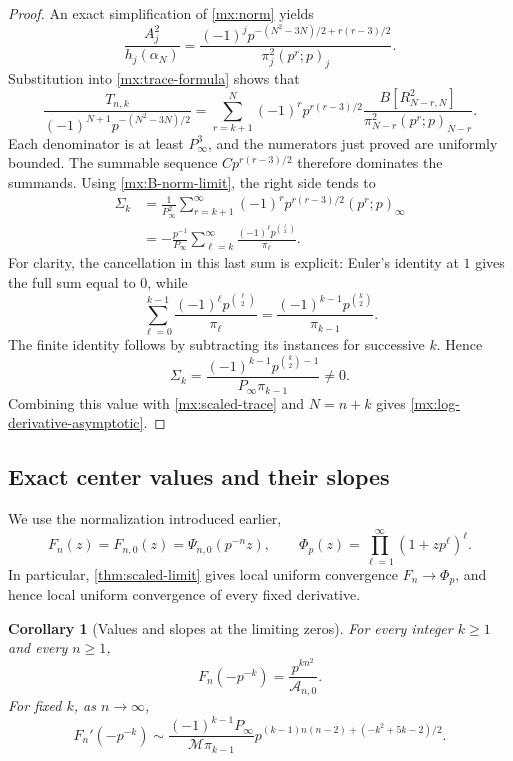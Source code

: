 \documentclass[11pt]{article}
\numberwithin{equation}{section}
\newtheorem{corollary}[corollary]{Corollary}
\theoremstyle{definition}
\theoremstyle{remark}
\begin{document}
\begin{proof}
An exact simplification of \eqref{mx:norm} yields
\begin{equation}\label{mx:norm-ratio}
 \frac{A_j^2}{h_j(\alpha_N)}
 =\frac{(-1)^j
 p^{-(N^2-3N)/2+r(r-3)/2}}
 {\pi_j^2(p^r;p)_j}.
\end{equation}
Substitution into \eqref{mx:trace-formula} shows that
\begin{equation}\label{mx:scaled-trace}
 \frac{T_{n,k}}{(-1)^{N+1}p^{-(N^2-3N)/2}}
 =\sum_{r=k+1}^{N}
 (-1)^rp^{r(r-3)/2}
 \frac{B[R_{N-r,N}^2]}
 {\pi_{N-r}^2(p^r;p)_{N-r}}.
\end{equation}
Each denominator is at least $P_\infty^3$, and the numerators just
proved are uniformly bounded.  The summable sequence
$C p^{r(r-3)/2}$ therefore dominates the summands.
Using \eqref{mx:B-norm-limit}, the right side tends to
\begin{align}
 \Sigma_k
 &=\frac1{P_\infty^2}
 \sum_{r=k+1}^{\infty}
 (-1)^rp^{r(r-3)/2}(p^r;p)_\infty\label{mx:Euler-tail}\\
 &=-\frac{p^{-1}}{P_\infty}
 \sum_{\ell=k}^{\infty}
 \frac{(-1)^\ell p^{\binom\ell2}}{\pi_\ell}.
 \nonumber
\end{align}
For clarity, the cancellation in this last sum is explicit:
Euler's identity at $1$ gives the full sum equal to $0$, while
\[
 \sum_{\ell=0}^{k-1}
 \frac{(-1)^\ell p^{\binom\ell2}}{\pi_\ell}
 =\frac{(-1)^{k-1}p^{\binom k2}}{\pi_{k-1}}.
\]
The finite identity follows by subtracting its instances for
successive $k$.  Hence
\[
 \Sigma_k=
 \frac{(-1)^{k-1}p^{\binom k2-1}}
 {P_\infty\pi_{k-1}}\ne0.
\]
Combining this value with \eqref{mx:scaled-trace} and $N=n+k$
gives \eqref{mx:log-derivative-asymptotic}.
\end{proof}

\subsection{Exact center values and their slopes}

We use the normalization introduced earlier,
\[
 F_n(z)=F_{n,0}(z)
 =\Psi_{n,0}(p^{-n}z),\qquad
 \Phi_p(z)=\prod_{\ell=1}^{\infty}(1+zp^\ell)^\ell.
\]
In particular, \cref{thm:scaled-limit} gives local uniform convergence
$F_n\to\Phi_p$, and hence local uniform convergence of every fixed
derivative.

\begin{corollary}[Values and slopes at the limiting zeros]
\label{mx:center-slopes}
For every integer $k\ge1$ and every $n\ge1$,
\begin{equation}\label{mx:exact-center}
 F_n(-p^{-k})=\frac{p^{kn^2}}{\mathcal A_{n,0}}.
\end{equation}
For fixed $k$, as $n\to\infty$,
\begin{equation}\label{mx:center-slope}
 F_n'(-p^{-k})
 \sim
 \frac{(-1)^{k-1}P_\infty}{\mathcal M\pi_{k-1}}
 p^{(k-1)n(n-2)+(-k^2+5k-2)/2}.
\end{equation}
\end{corollary}
\end{document}
